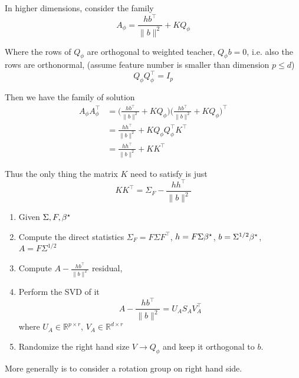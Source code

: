 \begin{example}
In higher dimensions, consider the family
\[
A_{\phi}=\frac{hb^{\top}}{\|b\|^{2}}+KQ_{\phi}
\]

Where the rows of $Q_{\phi}$ are orthogonal to weighted teacher,
$Q_{\phi}b=0$, i.e. also the rows are orthonormal, (assume feature
number is smaller than dimension $p\leq d$)
\[
Q_{\phi}Q_{\phi}^{\top}=I_{p}
\]

Then we have the family of solution
\begin{align*}
A_{\phi}A_{\phi}^{\top} & =\Big(\frac{hb^{\top}}{\|b\|^{2}}+KQ_{\phi}\Big)\Big(\frac{hb^{\top}}{\|b\|^{2}}+KQ_{\phi}\Big)^{\top}\\
 & =\frac{hh^{\top}}{\|b\|^{2}}+KQ_{\phi}Q_{\phi}^{\top}K^{\top}\\
 & =\frac{hh^{\top}}{\|b\|^{2}}+KK^{\top}
\end{align*}

Thus the only thing the matrix $K$ need to satisfy is just
\[
KK^{\top}=\Sigma_{F}-\frac{hh^{\top}}{\|b\|^{2}}
\]

\begin{algorithm}
\begin{enumerate}
\item Given $\Sigma,F,{\beta^{\star}}$
\item Compute the direct statistics $\Sigma_{F}=F\Sigma F^{\top}$, $h=F\Sigma{\beta^{\star}}$,
$b=\Sigma^{1/2}{\beta^{\star}}$, $A=F\Sigma^{1/2}$
\item Compute $A-\frac{hb^{\top}}{\|b\|^{2}}$ residual,
\item Perform the SVD of it
\[
A-\frac{hb^{\top}}{\|b\|^{2}}=U_{A}S_{A}V_{A}^{\top}
\]
where $U_{A}\in\mathbb{R}^{p\times r}$, $V_{A}\in\mathbb{R}^{d\times r}$
\item Randomize the right hand size $V\to Q_{\phi}$ and keep it orthogonal
to $b$.
\end{enumerate}
\caption{Generating a family of equivalent feature functions $F_{\phi}$}
\end{algorithm}

\end{example}
More generally is to consider a rotation group on right hand side.
